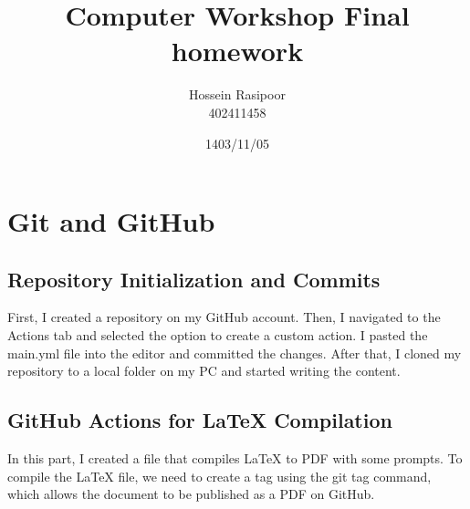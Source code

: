 \documentclass[titlepage]{article}
\title{ Computer Workshop Final homework}
\author{Hossein Rasipoor \\ 402411458}
\date{1403/11/05}
\begin{document}
\maketitle
\tableofcontents
\newpage

\section{Git and GitHub}
\subsection{Repository Initialization and Commits}
First, I created a repository on my GitHub account. Then, I navigated to the Actions tab and selected the option to create a custom action. I pasted the main.yml file into the editor and committed the changes. After that, I cloned my repository to a local folder on my PC and started writing the content.

\subsection{GitHub Actions for LaTeX Compilation}
In this part, I created a file that compiles LaTeX to PDF with some prompts. To compile the LaTeX file, we need to create a tag using the git tag command, which allows the document to be published as a PDF on GitHub.
\end{document}
